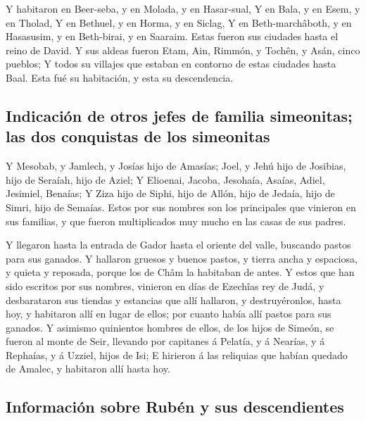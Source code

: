  Y habitaron en Beer-seba, y en Molada, y en Hasar-sual,
 Y en Bala, y en Esem, y en Tholad,  Y en
Bethuel, y en Horma, y en Siclag,  Y en Beth-marchâboth,
y en Hasasusim, y en Beth-birai, y en Saaraim. Estas fueron sus ciudades
hasta el reino de David.  Y sus aldeas fueron Etam, Ain,
Rimmón, y Tochên, y Asán, cinco pueblos;  Y todos su
villajes que estaban en contorno de estas ciudades hasta Baal. Esta fué
su habitación, y esta su descendencia.

\hypertarget{indicaciuxf3n-de-otros-jefes-de-familia-simeonitas-las-dos-conquistas-de-los-simeonitas}{%
\subsection{Indicación de otros jefes de familia simeonitas; las dos
conquistas de los
simeonitas}\label{indicaciuxf3n-de-otros-jefes-de-familia-simeonitas-las-dos-conquistas-de-los-simeonitas}}

 Y Mesobab, y Jamlech, y Josías hijo de Amasías;
 Joel, y Jehú hijo de Josibias, hijo de Seraíah, hijo de
Aziel;  Y Elioenai, Jacoba, Jesohaía, Asaías, Adiel,
Jesimiel, Benaías;  Y Ziza hijo de Siphi, hijo de Allón,
hijo de Jedaía, hijo de Simri, hijo de Semaías.  Estos
por sus nombres son los principales que vinieron en sus familias, y que
fueron multiplicados muy mucho en las casas de sus padres.

 Y llegaron hasta la entrada de Gador hasta el oriente
del valle, buscando pastos para sus ganados.  Y hallaron
gruesos y buenos pastos, y tierra ancha y espaciosa, y quieta y
reposada, porque los de Châm la habitaban de antes.  Y
estos que han sido escritos por sus nombres, vinieron en días de
Ezechîas rey de Judá, y desbarataron sus tiendas y estancias que allí
hallaron, y destruyéronlos, hasta hoy, y habitaron allí en lugar de
ellos; por cuanto había allí pastos para sus ganados.  Y
asimismo quinientos hombres de ellos, de los hijos de Simeón, se fueron
al monte de Seir, llevando por capitanes á Pelatía, y á Nearías, y á
Rephaías, y á Uzziel, hijos de Isi;  E hirieron á las
reliquias que habían quedado de Amalec, y habitaron allí hasta hoy.

\hypertarget{informaciuxf3n-sobre-rubuxe9n-y-sus-descendientes}{%
\subsection{Información sobre Rubén y sus
descendientes}\label{informaciuxf3n-sobre-rubuxe9n-y-sus-descendientes}}

